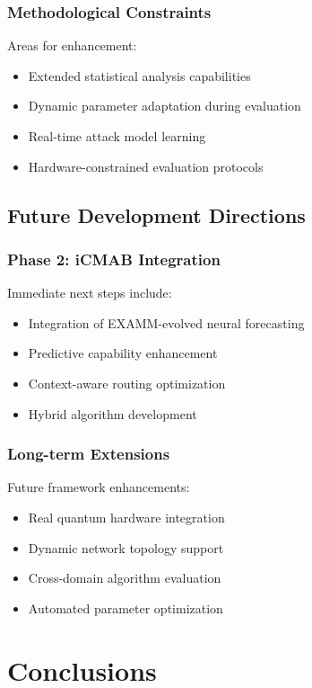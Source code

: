\documentclass[11pt,a4paper]{article}
\begin{document}
\subsubsection{Methodological Constraints}

Areas for enhancement:
\begin{itemize}
\item Extended statistical analysis capabilities
\item Dynamic parameter adaptation during evaluation
\item Real-time attack model learning
\item Hardware-constrained evaluation protocols
\end{itemize}

\subsection{Future Development Directions}

\subsubsection{Phase 2: iCMAB Integration}

Immediate next steps include:
\begin{itemize}
\item Integration of EXAMM-evolved neural forecasting
\item Predictive capability enhancement
\item Context-aware routing optimization
\item Hybrid algorithm development
\end{itemize}

\subsubsection{Long-term Extensions}

Future framework enhancements:
\begin{itemize}
\item Real quantum hardware integration
\item Dynamic network topology support
\item Cross-domain algorithm evaluation
\item Automated parameter optimization
\end{itemize}

\section{Conclusions}
\end{document}

